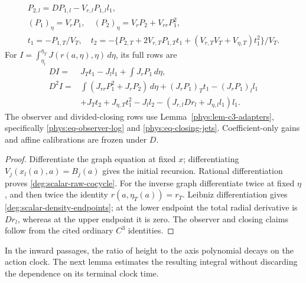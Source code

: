\begin{lemma}
\begin{equation}
\begin{gathered}
 P_{2,l}=DP_{1,l}-V_{r,l}P_{1,l}l_1,\\
 (P_1)_\eta=V_rP_1,\quad
 (P_2)_\eta=V_rP_2+V_{rr}P_1^2,\\
 t_1=-P_{1,T}/V_T,\quad
 t_2=-\{P_{2,T}+2V_{r,T}P_{1,T}t_1
              +(V_{r,T}V_T+V_{\eta,T})t_1^2\}/V_T .
 \end{gathered}
\end{equation}
For \(I=\int_{\eta_l}^{\eta_T}J(r(a,\eta),\eta)\,d\eta\),
its full rows are
\begin{equation}\label{deg:scalar-density-endpoints}
 \begin{aligned}
 DI={}&J_Tt_1-J_ll_1+\int J_rP_1\,d\eta,\\
 D^2I={}&\int(J_{rr}P_1^2+J_rP_2)\,d\eta
       +(J_rP_1)_Tt_1-(J_rP_1)_ll_1\\
 &+J_Tt_2+J_{\eta,T}t_1^2-J_ll_2
       -(J_{r,l}Dr_l+J_{\eta,l}l_1)l_1 .
 \end{aligned}
\end{equation}
The observer and divided-closing rows use
Lemma~\ref{phys:lem-c3-adapters}, specifically
\eqref{phys:eq-observer-log} and \eqref{phys:eq-closing-jets}.
Coefficient-only gains and affine calibrations are frozen under \(D\).
\end{lemma}
\begin{proof}
Differentiate the graph equation at fixed \(x\); differentiating
\(V_j(x_l(a),a)=B_j(a)\) gives the initial recursion.
Rational differentiation proves \eqref{deg:scalar-raw-cocycle}.
For the inverse graph differentiate twice at fixed \(\eta\), and
then twice the identity \(r(a,\eta_T(a))=r_T\).
Leibniz differentiation gives \eqref{deg:scalar-density-endpoints};
at the lower endpoint the total radial derivative is \(Dr_l\),
whereas at the upper endpoint it is zero. The observer and closing
claims follow from the cited ordinary \(C^3\) identities.
\end{proof}

In the inward passages, the ratio of height to the axis polynomial
decays on the action clock. The next lemma estimates the resulting
integral without discarding the dependence on its terminal clock time.

